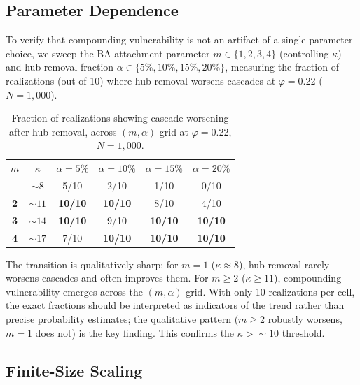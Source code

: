 \documentclass[aps,pre,twocolumn,superscriptaddress,showpacs]{revtex4-2}
\begin{document}
\subsection{Parameter Dependence}
\label{sec:params}

To verify that compounding vulnerability is not an artifact of a single parameter choice, we sweep the BA attachment parameter $m \in \{1,2,3,4\}$ (controlling $\kappa$) and hub removal fraction $\alpha \in \{5\%, 10\%, 15\%, 20\%\}$, measuring the fraction of realizations (out of 10) where hub removal worsens cascades at $\varphi=0.22$ ($N=1{,}000$).

\begin{table}[h]
\caption{Fraction of realizations showing cascade worsening after hub removal, across $(m, \alpha)$ grid at $\varphi=0.22$, $N=1{,}000$.}
\label{tab:params}
\begin{ruledtabular}
\begin{tabular}{cccccc}
$m$ & $\kappa$ & \multicolumn{1}{c}{$\alpha=5\%$} & \multicolumn{1}{c}{$\alpha=10\%$} & \multicolumn{1}{c}{$\alpha=15\%$} & \multicolumn{1}{c}{$\alpha=20\%$} \\
\colrule
1 & ${\sim}8$ & 5/10 & 2/10 & 1/10 & 0/10 \\
\textbf{2} & ${\sim}11$ & \textbf{10/10} & \textbf{10/10} & 8/10 & 4/10 \\
\textbf{3} & ${\sim}14$ & \textbf{10/10} & 9/10 & \textbf{10/10} & \textbf{10/10} \\
\textbf{4} & ${\sim}17$ & 7/10 & \textbf{10/10} & \textbf{10/10} & \textbf{10/10} \\
\end{tabular}
\end{ruledtabular}
\end{table}

The transition is qualitatively sharp: for $m=1$ ($\kappa \approx 8$), hub removal rarely worsens cascades and often improves them. For $m \geq 2$ ($\kappa \geq 11$), compounding vulnerability emerges across the $(m, \alpha)$ grid. With only 10 realizations per cell, the exact fractions should be interpreted as indicators of the trend rather than precise probability estimates; the qualitative pattern ($m \geq 2$ robustly worsens, $m=1$ does not) is the key finding. This confirms the $\kappa > {\sim}10$ threshold.

\subsection{Finite-Size Scaling}
\label{sec:fss}
\end{document}
